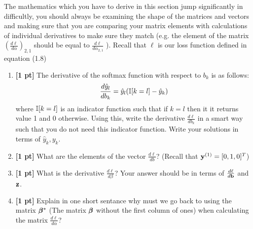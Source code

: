 \begin{enumerate}
The mathematics which you have to derive in this section jump significantly in difficultly, you should always be examining the shape of the matrices and vectors and making sure that you are comparing your matrix elements with calculations of individual derivatives to make sure they match (e.g. the element of the matrix $(\frac{d\ell}{d\alpha})_{2,1}$ should be equal to $\frac{d\ell}{d\alpha_{2,1}}$  ). Recall that $\ell$ is our loss function defined in equation (1.8)
    
    \begin{enumerate}
        \item \textbf{[1 pt]} The derivative of the softmax function with respect to $b_k$ is as follows:
        $$\frac{d\hat{y}_l}{db_k} = \hat{y}_l(\mathbb{I}[k=l]-\hat{y}_k)$$ 
        where $\mathbb{I}[k=l]$ is an indicator function such that if $k=l$ then it it returns value 1 and 0 otherwise. 
        Using this, write the derivative $\frac{d\ell}{db_k}$ in a smart way such that you do not need this indicator function. Write your solutions in terms of $\hat{y}_k,y_k$.
        
        
        \begin{tcolorbox}[fit,height=2cm, width=12cm, blank, borderline={1pt}{-2pt}]
        \end{tcolorbox}
        
        
        \item \textbf{[1 pt]} What are the elements of the vector $\frac{d\ell}{db}$? (Recall that  $\mathbf{y}^{(1)}=[0,1,0]^T$)
        
        
        \begin{tcolorbox}[fit,height=1cm, width=6cm, blank, borderline={1pt}{-2pt}]
        \end{tcolorbox}
        
        
        
        \item \textbf{[1 pt]} What is the derivative $\frac{d\ell}{d\beta}$? Your answer should be in terms of $\frac{d\ell}{d\mathbf{b}}$ and $\mathbf{z}$.
        
        
        \begin{tcolorbox}[fit,height=3cm, width=12cm, blank, borderline={1pt}{-2pt}]
        \end{tcolorbox}
        
        
        
        \item \textbf{[1 pt]} Explain in one short sentance why must we go back to using the matrix $\boldsymbol \beta^*$ (The matrix $\boldsymbol \beta$ without the first column of ones) when calculating the matrix $\frac{d\ell}{d\alpha}$?
        

\end{enumerate}
\end{enumerate}
